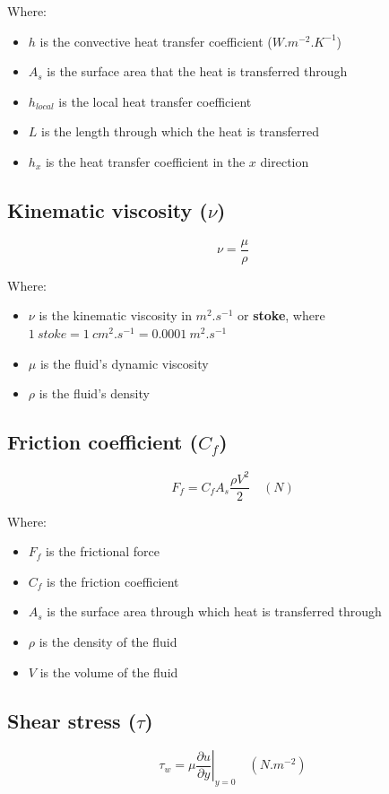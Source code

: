 \documentclass[11pt]{article}
\begin{document}
Where:
\begin{itemize}
\item \(h\) is the convective heat transfer coefficient (\(\unit{W.m^{-2}.K^{-1}}\))
\item \(A_s\) is the surface area that the heat is transferred through
\item \(h_{local}\) is the local heat transfer coefficient
\item \(L\) is the length through which the heat is transferred
\item \(h_x\) is the heat transfer coefficient in the \(x\) direction
\end{itemize}

\subsection{Kinematic viscosity (\(\nu\))}
\label{sec:orgc77349e}
\[\nu = \frac{\mu}{\rho}\]

Where:
\begin{itemize}
\item \(\nu\) is the kinematic viscosity in \(\unit{m^2.s^{-1}}\) or \textbf{stoke}, where \(\qty{1}{stoke} = \qty{1}{cm^2.s^{-1}} = \qty{0.0001}{m^2.s^{-1}}\)
\item \(\mu\) is the fluid's dynamic viscosity
\item \(\rho\) is the fluid's density
\end{itemize}

\subsection{Friction coefficient (\(C_f\))}
\label{sec:org3e40de1}
\[F_f = C_f A_s \frac{\rho V^2}{2} \quad (\unit{N})\]

Where:
\begin{itemize}
\item \(F_f\) is the frictional force
\item \(C_f\) is the friction coefficient
\item \(A_s\) is the surface area through which heat is transferred through
\item \(\rho\) is the density of the fluid
\item \(V\) is the volume of the fluid
\end{itemize}

\subsection{Shear stress (\(\tau\))}
\label{sec:orgfed59ec}
\[\tau_{w} = \mu \left. \frac{\partial u}{\partial y} \right|_{y=0} \quad (\unit{N.m^{-2}})\]
\end{document}
